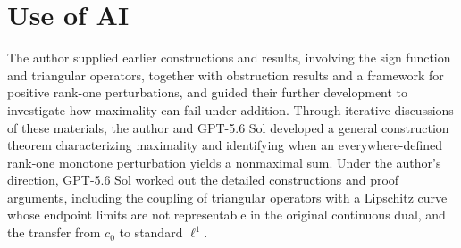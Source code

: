 \section*{Use of AI}
The author supplied earlier constructions and results, involving the sign function and triangular operators, together with obstruction results and a framework for positive rank-one perturbations, and guided their further development to investigate how maximality can fail under addition. Through iterative discussions of these materials, the author and GPT-5.6 Sol developed a general construction theorem characterizing maximality and identifying when an everywhere-defined rank-one monotone perturbation yields a nonmaximal sum.  Under the author's direction, GPT-5.6 Sol worked out the detailed constructions and proof arguments, including the coupling of triangular operators with a Lipschitz curve whose endpoint limits are not representable in the original continuous dual, and the transfer from $c_0$ to standard $\ell^1$. 






\begingroup
\raggedright


\endgroup



